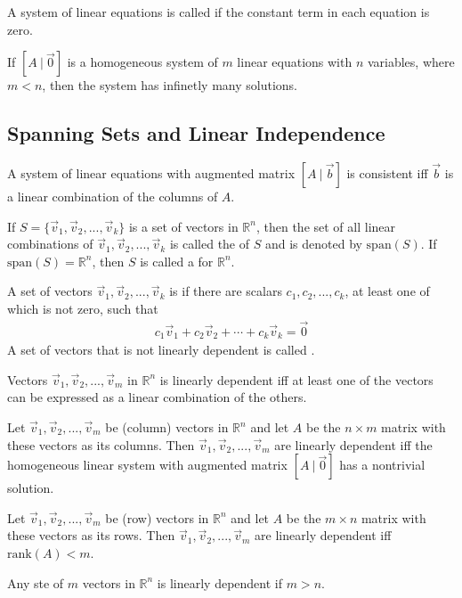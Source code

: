 \documentclass{article}
\begin{document}
\begin{definition}
    A system of linear equations is called  if the constant term in each equation is zero.
\end{definition}
\begin{theorem}
    If $[A\:|\:\vec 0]$ is a homogeneous system of $m$ linear equations with $n$ variables, where $m < n$, then the system has infinetly many solutions.
\end{theorem}
\subsection{Spanning Sets and Linear Independence}
\begin{theorem}
    A system of linear equations with augmented matrix $[A\:|\:\vec b]$ is consistent iff $\vec b$ is a linear combination of the columns of $A$.
\end{theorem}
\begin{definition}
    If $S=\{\vec v_1, \vec v_2, ..., \vec v_k\}$ is a set of vectors in $\mathbb{R}^n$, then the set of all linear combinations of $\vec v_1, \vec v_2, ..., \vec v_k$ is called the  of $S$ and is denoted by $\text{span}(S)$. If $\text{span}(S)=\mathbb{R}^n$, then $S$ is called a  for $\mathbb{R}^n$.
\end{definition}
\begin{definition}
    A set of vectors $\vec v_1, \vec v_2, ..., \vec v_k$ is  if there are scalars $c_1, c_2, ..., c_k$, at least one of which is not zero, such that
    \begin{gather*}
        c_1\vec v_1 + c_2\vec v_2 + \cdots + c_k\vec v_k = \vec 0
    \end{gather*}
    A set of vectors that is not linearly dependent is called .
\end{definition}
\begin{theorem}
    Vectors $\vec v_1, \vec v_2, ..., \vec v_m$ in $\mathbb{R}^n$ is linearly dependent iff at least one of the vectors can be expressed as a linear combination of the others.
\end{theorem}
\begin{theorem}
    Let $\vec v_1, \vec v_2, ..., \vec v_m$ be (column) vectors in $\mathbb{R}^n$ and let $A$ be the $n\times m$ matrix with these vectors as its columns. Then $\vec v_1, \vec v_2, ..., \vec v_m$ are linearly dependent iff the homogeneous linear system with augmented matrix $[A\:|\:\vec 0]$ has a nontrivial solution.
\end{theorem}
\begin{theorem}
    Let $\vec v_1, \vec v_2, ..., \vec v_m$ be (row) vectors in $\mathbb{R}^n$ and let $A$ be the $m\times n$ matrix with these vectors as its rows. Then $\vec v_1, \vec v_2, ..., \vec v_m$ are linearly dependent iff $\text{rank}(A) < m$.
\end{theorem}
\begin{theorem}
    Any ste of $m$ vectors in $\mathbb{R}^n$ is linearly dependent if $m > n$.
\end{theorem}
\end{document}
